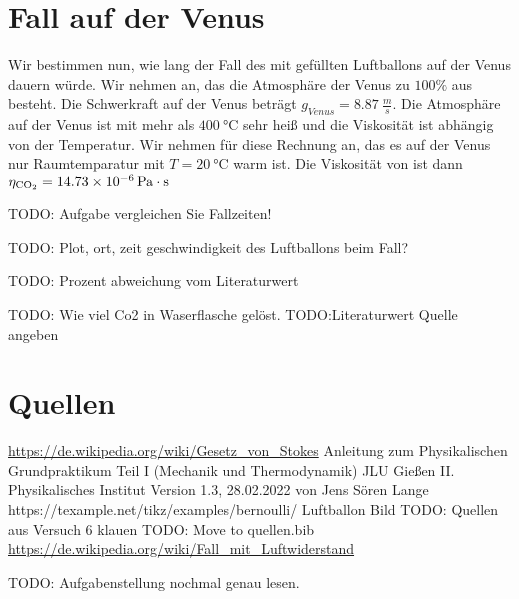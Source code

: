 \documentclass{article}
\begin{document}
    \section{Fall auf der Venus}
        Wir bestimmen nun, wie lang der Fall des mit  gefüllten Luftballons auf der Venus dauern würde. Wir nehmen an,
        das die Atmosphäre der Venus zu \( 100\% \) aus  besteht. Die Schwerkraft auf der Venus beträgt \(g_{Venus} = \SI{8.87}{\frac{m}{s}}\).
        Die Atmosphäre auf der Venus ist mit mehr als \(\SI{400}{\celsius}\) sehr heiß und die Viskosität ist abhängig von der Temperatur.
        Wir nehmen für diese Rechnung an, das es auf der Venus nur Raumtemparatur mit \(T = \SI{20}{\celsius}\) warm ist.
        Die Viskosität von  ist dann \( \eta_{\ce{CO2}} = \SI{14.73e-6}{\pascal\cdot\second} \)

        TODO: Aufgabe vergleichen Sie Fallzeiten!

    TODO: Plot, ort, zeit geschwindigkeit des Luftballons beim Fall?

    TODO: Prozent abweichung vom Literaturwert

    TODO: Wie viel Co2 in Waserflasche gelöst.
    TODO:Literaturwert Quelle angeben

    \section{Quellen}
        \url{https://de.wikipedia.org/wiki/Gesetz_von_Stokes}
        Anleitung zum Physikalischen Grundpraktikum Teil I (Mechanik und Thermodynamik) JLU Gießen II. Physikalisches Institut Version 1.3, 28.02.2022 von Jens Sören Lange
        https://texample.net/tikz/examples/bernoulli/
        Luftballon Bild
        TODO: Quellen aus Versuch 6 klauen
        TODO: Move to quellen.bib
        \url{https://de.wikipedia.org/wiki/Fall_mit_Luftwiderstand}

    TODO: Aufgabenstellung nochmal genau lesen.
\end{document}
